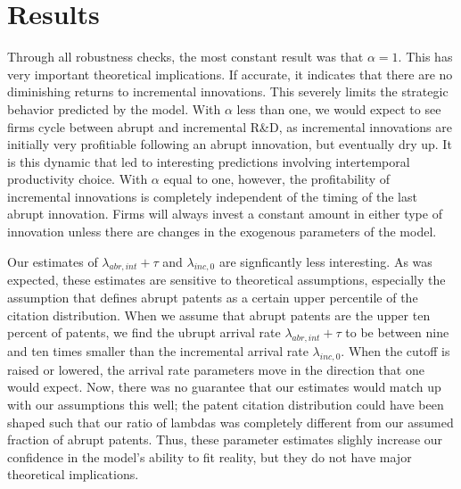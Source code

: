 \documentclass[letterpaper,12pt]{article}
\theoremstyle{definition}
\begin{document}
\section{Results}\label{sec:Results}

Through all robustness checks, the most constant result was that $\alpha = 1$. This has very important theoretical implications.  If accurate, it indicates that there are no diminishing returns to incremental innovations. This severely limits the strategic behavior predicted by the model. With $\alpha$ less than one, we would expect to see firms cycle between abrupt and incremental R\&D, as incremental innovations are initially very profitiable following an abrupt innovation, but eventually dry up. It is this dynamic that led to interesting predictions involving intertemporal productivity choice. With $\alpha$ equal to one, however, the profitability of incremental innovations is completely independent of the timing of the last abrupt innovation. Firms will always invest a constant amount in either type of innovation unless there are changes in the exogenous parameters of the model.

Our estimates of $\lambda_{abr, int} + \tau$ and $\lambda_{inc,0}$ are signficantly less interesting. As was expected, these estimates are sensitive to theoretical assumptions, especially the assumption that defines abrupt patents as a certain upper percentile of the citation distribution. When we assume that abrupt patents are the upper ten percent of patents, we find the ubrupt arrival rate $\lambda_{abr, int} + \tau$ to be between nine and ten times smaller than the incremental arrival rate $\lambda_{inc,0}$. When the cutoff is raised or lowered, the arrival rate parameters move in the direction that one would expect. Now, there was no guarantee that our estimates would match up with our assumptions this well; the patent citation distribution could have been shaped such that our ratio of lambdas was completely different from our assumed fraction of abrupt patents. Thus, these parameter estimates slighly increase our confidence in the model's ability to fit reality, but they do not have major theoretical implications.
\end{document}

